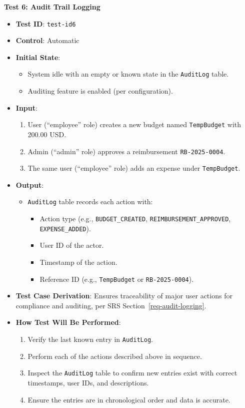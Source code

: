\documentclass[12pt, titlepage]{article}
\begin{document}
\textbf{Test 6: Audit Trail Logging}
\begin{itemize}
    \item \textbf{Test ID}: \texttt{test-id6}
    \item \textbf{Control}: Automatic
    \item \textbf{Initial State}:
    \begin{itemize}
        \item System idle with an empty or known state in the \texttt{AuditLog} table.
        \item Auditing feature is enabled (per configuration).
    \end{itemize}
    \item \textbf{Input}:
    \begin{enumerate}
        \item User (``employee'' role) creates a new budget named \texttt{TempBudget} with 200.00 USD.
        \item Admin (``admin'' role) approves a reimbursement \texttt{RB-2025-0004}.
        \item The same user (``employee'' role) adds an expense under \texttt{TempBudget}.
    \end{enumerate}
    \item \textbf{Output}:
    \begin{itemize}
        \item \texttt{AuditLog} table records each action with:
        \begin{itemize}
            \item Action type (e.g., \texttt{BUDGET\_CREATED}, \texttt{REIMBURSEMENT\_APPROVED}, \texttt{EXPENSE\_ADDED}).
            \item User ID of the actor.
            \item Timestamp of the action.
            \item Reference ID (e.g., \texttt{TempBudget} or \texttt{RB-2025-0004}).
        \end{itemize}
    \end{itemize}
    \item \textbf{Test Case Derivation}:
    Ensures traceability of major user actions for compliance and auditing, per SRS Section~\ref{req-audit-logging}.
    \item \textbf{How Test Will Be Performed}:
    \begin{enumerate}
        \item Verify the last known entry in \texttt{AuditLog}.
        \item Perform each of the actions described above in sequence.
        \item Inspect the \texttt{AuditLog} table to confirm new entries exist with correct timestamps, user IDs, and descriptions.
        \item Ensure the entries are in chronological order and data is accurate.
    \end{enumerate}
\end{itemize}
\end{document}
